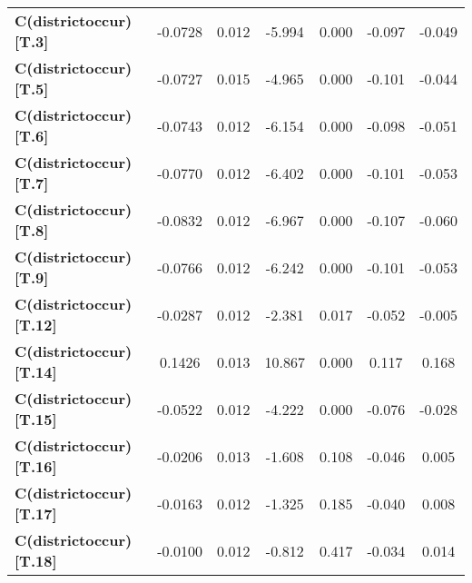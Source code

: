 \begin{center}
\begin{tabular}{lcccccc}
\textbf{C(districtoccur)[T.3]}                                                    &      -0.0728  &        0.012     &    -5.994  &         0.000        &       -0.097    &       -0.049     \\
\textbf{C(districtoccur)[T.5]}                                                    &      -0.0727  &        0.015     &    -4.965  &         0.000        &       -0.101    &       -0.044     \\
\textbf{C(districtoccur)[T.6]}                                                    &      -0.0743  &        0.012     &    -6.154  &         0.000        &       -0.098    &       -0.051     \\
\textbf{C(districtoccur)[T.7]}                                                    &      -0.0770  &        0.012     &    -6.402  &         0.000        &       -0.101    &       -0.053     \\
\textbf{C(districtoccur)[T.8]}                                                    &      -0.0832  &        0.012     &    -6.967  &         0.000        &       -0.107    &       -0.060     \\
\textbf{C(districtoccur)[T.9]}                                                    &      -0.0766  &        0.012     &    -6.242  &         0.000        &       -0.101    &       -0.053     \\
\textbf{C(districtoccur)[T.12]}                                                   &      -0.0287  &        0.012     &    -2.381  &         0.017        &       -0.052    &       -0.005     \\
\textbf{C(districtoccur)[T.14]}                                                   &       0.1426  &        0.013     &    10.867  &         0.000        &        0.117    &        0.168     \\
\textbf{C(districtoccur)[T.15]}                                                   &      -0.0522  &        0.012     &    -4.222  &         0.000        &       -0.076    &       -0.028     \\
\textbf{C(districtoccur)[T.16]}                                                   &      -0.0206  &        0.013     &    -1.608  &         0.108        &       -0.046    &        0.005     \\
\textbf{C(districtoccur)[T.17]}                                                   &      -0.0163  &        0.012     &    -1.325  &         0.185        &       -0.040    &        0.008     \\
\textbf{C(districtoccur)[T.18]}                                                   &      -0.0100  &        0.012     &    -0.812  &         0.417        &       -0.034    &        0.014     \\

\end{tabular}
\end{center}
